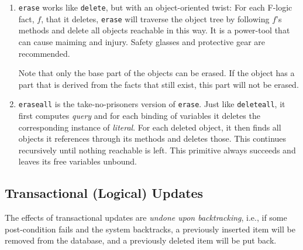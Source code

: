 \documentclass[11pt]{article}
\newcommand{\fl}{\mbox{F-logic}\xspace}
\begin{document}
\begin{enumerate}
  \smallskip
  
  Unlike the {\tt delete} predicate, {\tt deleteall} \emph{always}
  succeeds. Also, {\tt deleteall} leaves all variables unbound.
  
\item {\tt erase} works like {\tt delete}, but with an object-oriented
  twist: For each \fl fact, $f$, that it deletes, {\tt erase} will
  traverse the object tree by following $f$'s methods and delete all
  objects reachable in this way. It is a power-tool that can cause
  maiming and injury. Safety glasses and protective gear are
  recommended.
  
  Note that only the base part of the objects can be erased. If the
  object has a part that is derived from the facts that still exist, this
  part will not be erased.
  
\item {\tt eraseall} is the take-no-prisoners version of {\tt erase}.
  Just like {\tt deleteall}, it first computes \emph{query} and for each
  binding of variables it deletes the corresponding instance of
  \emph{literal}. For each deleted object, it then finds all objects it
  references through its methods and deletes those. This continues
  recursively until nothing reachable is left.  This primitive always
  succeeds and leaves its free variables unbound.
\end{enumerate}


\subsection{Transactional (Logical) Updates}


%
The effects of transactional updates are \emph{undone upon backtracking},
i.e., if
some post-condition fails and the system backtracks, a previously inserted
item will be removed from the database, and a previously deleted item will be
put back.
\end{document}
